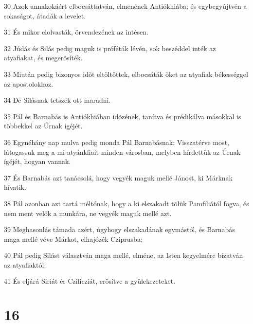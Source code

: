 \par 30 Azok annakokáért elbocsáttatván, elmenének Antiókhiába; és egybegyûjtvén a sokaságot, átadák a levelet.
\par 31 És mikor elolvasták, örvendezének az intésen.
\par 32 Júdás és Silás pedig maguk is próféták lévén, sok beszéddel inték az atyafiakat, és megerõsíték.
\par 33 Miután pedig bizonyos idõt eltöltöttek, elbocsáták õket az atyafiak békességgel az apostolokhoz.
\par 34 De Silásnak tetszék ott maradni.
\par 35 Pál és Barnabás is Antiókhiában idõzének, tanítva és prédikálva másokkal is többekkel az Úrnak ígéjét.
\par 36 Egynéhány nap mulva pedig monda Pál Barnabásnak: Visszatérve most, látogassuk meg a mi atyánkfiait minden városban, melyben hírdettük az Úrnak ígéjét, hogyan vannak.
\par 37 És Barnabás azt tanácsolá, hogy vegyék maguk mellé Jánost, ki Márknak hívatik.
\par 38 Pál azonban azt tartá méltónak, hogy a ki elszakadt tõlük Pamfiliától fogva, és nem ment velök a munkára, ne vegyék maguk mellé azt.
\par 39 Meghasonlás támada azért, úgyhogy elszakadának egymástól, és Barnabás maga mellé véve Márkot, elhajózék Cziprusba;
\par 40 Pál pedig Silást választván maga mellé, elméne, az Isten kegyelmére bízatván az atyafiaktól.
\par 41 És eljárá Siriát és Czilicziát, erõsítve a gyülekezeteket.

\chapter{16}

